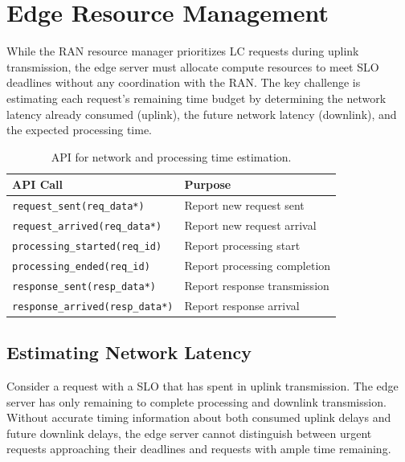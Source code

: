 \section{Edge Resource Management}
\label{sec:edge_sched}

While the RAN resource manager prioritizes LC requests during uplink transmission, the edge server must allocate compute resources to meet SLO deadlines without any coordination with the RAN.
The key challenge is estimating each request's remaining time budget by determining the network latency already consumed (uplink), the future network latency (downlink), and the expected processing time.

\begin{table}[]
\setlength{\tabcolsep}{10pt}
\renewcommand{\arraystretch}{1.0}
\centering
\footnotesize
\begin{tabular}{@{}ll@{}}
\toprule
\textbf{API Call} & \textbf{Purpose} \\ \midrule
\texttt{request\_sent(req\_data*)} & Report new request sent \\
\texttt{request\_arrived(req\_data*)} & Report new request arrival \\
\texttt{processing\_started(req\_id)} & Report processing start \\
\texttt{processing\_ended(req\_id)} & Report processing completion \\
\texttt{response\_sent(resp\_data*)} & Report response transmission \\ 
\texttt{response\_arrived(resp\_data*)} & Report response arrival \\\bottomrule
\end{tabular}
\vspace{-0.5em}
\caption{\sys{} API for network and processing time estimation.}
\label{tbl:smec-api}
\end{table}


\subsection{Estimating Network Latency}
\label{sec:reference-time}

Consider a request with a  SLO that has spent  in uplink transmission. 
The edge server has only  remaining to complete processing and downlink transmission.
Without accurate timing information about both consumed uplink delays and future downlink delays, the edge server cannot distinguish between urgent requests approaching their deadlines and requests with ample time remaining.

